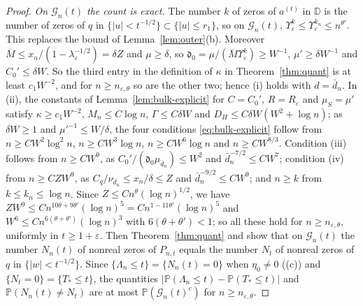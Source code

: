 \documentclass[11pt]{amsart}
\theoremstyle{definition}
\theoremstyle{remark}
\numberwithin{equation}{section}
\newcommand{\D}{\mathbb{D}}
\newcommand{\PP}{\mathbb{P}}
\newcommand{\eps}{\varepsilon}
\begin{document}
\begin{proof}
\emph{On $\mathcal G_n(t)$ the count is exact.} The number $k$ of zeros of $a^{(t)}$ in $\D$ is the number of zeros of $q$ in $\{|u|<t^{-1/2}\}\subset\{|u|\le r_1\}$, so on $\mathcal G_n(t)$, $\Upsilon_\eps^k\le\Upsilon_\eps^{k_n}\le n^{\theta'}$. This replaces the bound of Lemma~\ref{lem:outer}(b). Moreover $\overline M\le x_n/(1-\lambda_\eps^{-1/2})=\delta Z$ and $\mu\ge\delta$, so $\mathfrak d_0=\mu/(\overline M\Upsilon_\eps^k)\ge W^{-1}$, $\mu'\ge\delta W^{-1}$ and $C_0'\le\delta W$. So the third entry in the definition of $\kappa$ in Theorem~\ref{thm:quant} is at least $c_1W^{-2}$, and for $n\ge n_{\eps,\theta}$ so are the other two; hence (i) holds with $d=\bar d_n$. In (ii), the constants of Lemma~\ref{lem:bulk-explicit} for $C=C_0'$, $R=R_\eps$ and $\mu_S=\mu'$ satisfy $\kappa\ge c_1W^{-2}$, $M_n\le C\log n$, $\Gamma\le C\delta W$ and $D_H\le C\delta W(W^2+\log n)$; as $\delta W\ge1$ and $\mu'^{-1}\le W/\delta$, the four conditions \eqref{eq:bulk-explicit} follow from $n\ge CW^2\log^2n$, $n\ge CW^3\log n$, $n\ge CW^6\log n$ and $n\ge CW^{8/3}$. Condition (iii) follows from $n\ge CW^9$, as $C_0'/(\mathfrak d_0\mu_{\bar d_n})\le W^2$ and $\bar d_n^{-7/2}\le CW^7$; condition (iv) from $n\ge CZW^9$, as $C_q/\nu_{\bar d_n}\le x_n/\delta\le Z$ and $\bar d_n^{-9/2}\le CW^9$; and $n\ge k$ from $k\le k_n\le\log n$. Since $Z\le Cn^\theta(\log n)^{1/2}$, we have $ZW^9\le Cn^{10\theta+9\theta'}(\log n)^5=Cn^{1-11\theta'}(\log n)^5$ and $W^6\le Cn^{6(\theta+\theta')}(\log n)^3$ with $6(\theta+\theta')<1$; so all these hold for $n\ge n_{\eps,\theta}$, uniformly in $t\ge1+\eps$. Then Theorem~\ref{thm:quant} and \cite[\eqref{M-eq:PQ}]{Main} show that on $\mathcal G_n(t)$ the number $N_n(t)$ of nonreal zeros of $P_{n,t}$ equals the number $N_t$ of nonreal zeros of $q$ in $\{|w|<t^{-1/2}\}$. Since $\{\Lambda_n\le t\}=\{N_n(t)=0\}$ when $\eta_0\ne0$ (\cite[Lemma~\ref{M-lem:heat}]{Main}(c)) and $\{N_t=0\}=\{T_*\le t\}$, the quantities $|\PP(\Lambda_n\le t)-\PP(T_*\le t)|$ and $\PP(N_n(t)\ne N_t)$ are at most $\PP(\mathcal G_n(t)^c)$ for $n\ge n_{\eps,\theta}$.


\end{proof}
\end{document}
